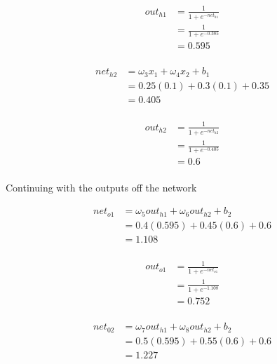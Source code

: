 \documentclass[10pt,a4paper]{article}
\begin{document}
\begin{equation}
\begin{split}
out_{h1} &= \frac{1}{1+e^{-net_{h1}}}\\ 
         &= \frac{1}{1+e^{-0.385}}\\ 
         &= 0.595\\
\end{split}
\end{equation}

\begin{equation}
\begin{split}
net_{h2} &= \omega_3 x_1 + \omega_4 x_2 + b_1 \\
         &= 0.25(0.1) + 0.3(0.1) + 0.35 \\
         &= 0.405\\
\end{split}
\end{equation}

\begin{equation}
\begin{split}
out_{h2} &= \frac{1}{1+e^{-net_{h2}}}\\ 
         &= \frac{1}{1+e^{-0.405}}\\ 
         &= 0.6\\
\end{split}
\end{equation}

Continuing with the outputs off the network

\begin{equation}
\begin{split}
net_{o1} &= \omega_5 out_{h1} + \omega_6 out_{h2} + b_2 \\
         &= 0.4(0.595) + 0.45(0.6) + 0.6 \\
         &= 1.108\\
\end{split}
\end{equation}

\begin{equation}
\begin{split}
out_{o1} &= \frac{1}{1+e^{-net_{o1}}}\\ 
         &= \frac{1}{1+e^{-1.108}}\\ 
         &= 0.752\\
\end{split}
\end{equation}

\begin{equation}
\begin{split}
net_{02} &= \omega_7 out_{h1} + \omega_8 out_{h2} + b_2 \\
         &= 0.5(0.595) + 0.55(0.6) + 0.6 \\
         &= 1.227\\
\end{split}
\end{equation}
\end{document}
